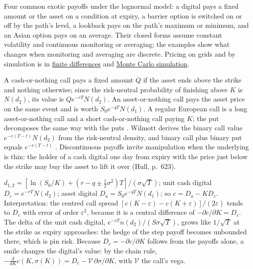 Four common exotic payoffs under the lognormal model: a digital pays a fixed amount or the asset on a condition at expiry, a barrier option is switched on or off by the path's level, a lookback pays on the path's maximum or minimum, and an Asian option pays on an average. Their closed forms assume constant volatility and continuous monitoring or averaging; the examples show what changes when monitoring and averaging are discrete. Pricing on grids and by simulation is in \hyperref[meth:finite-difference-option-pricing]{finite differences} and \hyperref[meth:monte-carlo-simulation]{Monte Carlo simulation}.

\begin{qfmethod}\label{meth:digital-option-valuation}
 A cash-or-nothing call pays a fixed amount $Q$ if the asset ends above the strike and nothing otherwise; since the risk-neutral probability of finishing above $K$ is $N(d_2)$, its value is $Qe^{-rT}N(d_2)$. An asset-or-nothing call pays the asset price on the same event and is worth $S_0e^{-qT}N(d_1)$. A regular European call is a long asset-or-nothing call and a short cash-or-nothing call paying $K$; the put decomposes the same way with the puts \citep[chap.~26, sec.~26.10, pp.~622--623]{s7-hulloptions}. Wilmott derives the binary call value $e^{-r(T-t)}N(d_2)$ from the risk-neutral density, and binary call plus binary put equals $e^{-r(T-t)}$ \citep[chap.~7, pp.~119--121; chap.~2, pp.~43--44]{wide-wilmott-pwoqf}. Discontinuous payoffs invite manipulation when the underlying is thin: the holder of a cash digital one day from expiry with the price just below the strike may buy the asset to lift it over (Hull, p.~623).

 $d_{1,2}=[\ln(S_0/K)+(r-q\pm\tfrac12\sigma^2)T]/(\sigma\sqrt T)$; unit cash digital $D_c=e^{-rT}N(d_2)$; asset digital $D_a=S_0e^{-qT}N(d_1)$; so $c=D_a-KD_c$. Interpretation: the centred call spread $[c(K-\varepsilon)-c(K+\varepsilon)]/(2\varepsilon)$ tends to $D_c$ with error of order $\varepsilon^2$, because it is a central difference of $-\partial c/\partial K=D_c$. The delta of the unit cash digital, $e^{-rT}n(d_2)/(S\sigma\sqrt T)$, grows like $1/\sqrt T$ at the strike as expiry approaches: the hedge of the step payoff becomes unbounded there, which is pin risk. Because $D_c=-\partial c/\partial K$ follows from the payoffs alone, a smile changes the digital's value: by the chain rule, $-\frac{d}{dK}c(K,\sigma(K))=D_c-\mathcal V\,\partial\sigma/\partial K$, with $\mathcal V$ the call's vega.


\end{qfmethod}
